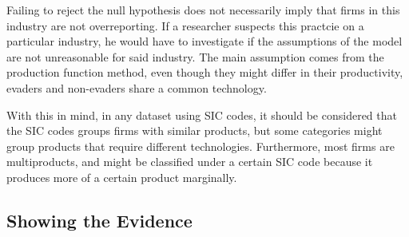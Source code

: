 \documentclass[
  12pt]{article}
\theoremstyle{definition}
\theoremstyle{remark}
\begin{document}
Failing to reject the null hypothesis does not necessarily imply that
firms in this industry are not overreporting. If a researcher suspects
this practcie on a particular industry, he would have to investigate if
the assumptions of the model are not unreasonable for said industry. The
main assumption comes from the production function method, even though
they might differ in their productivity, evaders and non-evaders share a
common technology.

With this in mind, in any dataset using SIC codes, it should be
considered that the SIC codes groups firms with similar products, but
some categories might group products that require different
technologies. Furthermore, most firms are multiproducts, and might be
classified under a certain SIC code because it produces more of a
certain product marginally.

\subsection{Showing the Evidence}\label{showing-the-evidence}
\end{document}
